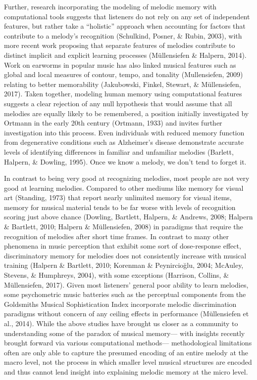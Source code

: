 \documentclass[english,man,floatsintext]{apa6}
\begin{document}
Further, research incorporating the modeling of melodic memory with computational tools suggests that listeners do not rely on any set of independent features, but rather take a \enquote{holistic} approach when accounting for factors that contribute to a melody's recognition (Schulkind, Posner, \& Rubin, 2003), with more recent work proposing that separate features of melodies contribute to distinct implicit and explicit learning processes (Müllensiefen \& Halpern, 2014).
Work on earworms in popular music has also linked musical features such as global and local measures of contour, tempo, and tonality (Mullensiefen, 2009) relating to better memorability (Jakubowski, Finkel, Stewart, \& Müllensiefen, 2017).
Taken together, modeling human memory using computational features suggests a clear rejection of any null hypothesis that would assume that all melodies are equally likely to be remembered, a position initially investigated by Ortmann in the early 20th century (Ortmann, 1933) and invites further investigation into this process.
Even individuals with reduced memory function from degenerative conditions such as Alzheimer's disease demonstrate accurate levels of identifying differences in familiar and unfamiliar melodies (Barlett, Halpern, \& Dowling, 1995).
Once we know a melody, we don't tend to forget it.

In contrast to being very good at recognizing melodies, most people are not very good at learning melodies.
Compared to other mediums like memory for visual art (Standing, 1973) that report nearly unlimited memory for visual items, memory for musical material tends to be far worse with levels of recognition scoring just above chance (Dowling, Bartlett, Halpern, \& Andrews, 2008; Halpern \& Bartlett, 2010; Halpern \& Müllensiefen, 2008) in paradigms that require the recognition of melodies after short time frames.
In contrast to many other phenomena in music perception that exhibit some sort of dose-response effect, discriminatory memory for melodies does not consistently increase with musical training (Halpern \& Bartlett, 2010; Korenman \& Peynircioğlu, 2004; McAuley, Stevens, \& Humphreys, 2004), with some exceptions (Harrison, Collins, \& Müllensiefen, 2017).
Given most listeners' general poor ability to learn melodies, some psychometric music batteries such as the perceptual components from the Goldsmiths Musical Sophistication Index incorporate melodic discrimination paradigms without concern of any ceiling effects in performance (Müllensiefen et al., 2014).
While the above studies have brought us closer as a community to understanding some of the paradox of musical memory--- with insights recently brought forward via various computational methods--- methodological limitations often are only able to capture the presumed encoding of an entire melody at the macro level, not the process in which smaller level musical structures are encoded and thus cannot lend insight into explaining melodic memory at the micro level.
\end{document}
